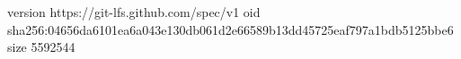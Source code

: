 version https://git-lfs.github.com/spec/v1
oid sha256:04656da6101ea6a043e130db061d2e66589b13dd45725eaf797a1bdb5125bbe6
size 5592544
